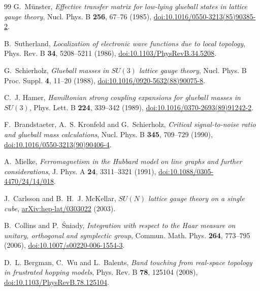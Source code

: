 \documentclass[11pt]{article}
\theoremstyle{plain}
\theoremstyle{definition}
\theoremstyle{remark}
\begin{document}
\begin{thebibliography}{99}
 G.~M\"unster,
  \emph{Effective transfer matrix for low-lying glueball states in lattice
  gauge theory}, Nucl. Phys. B \textbf{256}, 67--76 (1985),
  \href{https://doi.org/10.1016/0550-3213(85)90385-2}{doi:10.1016/0550-3213(85)90385-2}.

 B.~Sutherland,
  \emph{Localization of electronic wave functions due to local topology},
  Phys. Rev. B \textbf{34}, 5208--5211 (1986),
  \href{https://doi.org/10.1103/PhysRevB.34.5208}{doi:10.1103/PhysRevB.34.5208}.

 G.~Schierholz,
  \emph{Glueball masses in $SU(3)$ lattice gauge theory},
  Nucl. Phys. B Proc. Suppl. \textbf{4}, 11--20 (1988),
  \href{https://doi.org/10.1016/0920-5632(88)90075-8}{doi:10.1016/0920-5632(88)90075-8}.

 C.~J. Hamer,
  \emph{Hamiltonian strong coupling expansions for glueball masses in
  $SU(3)$}, Phys. Lett. B \textbf{224}, 339--342 (1989),
  \href{https://doi.org/10.1016/0370-2693(89)91242-2}{doi:10.1016/0370-2693(89)91242-2}.

 F.~Brandstaeter, A.~S. Kronfeld and G.~Schierholz,
  \emph{Critical signal-to-noise ratio and glueball mass calculations},
  Nucl. Phys. B \textbf{345}, 709--729 (1990),
  \href{https://doi.org/10.1016/0550-3213(90)90406-4}{doi:10.1016/0550-3213(90)90406-4}.

 A.~Mielke,
  \emph{Ferromagnetism in the Hubbard model on line graphs and further
  considerations}, J. Phys. A \textbf{24}, 3311--3321 (1991),
  \href{https://doi.org/10.1088/0305-4470/24/14/018}{doi:10.1088/0305-4470/24/14/018}.

 J.~Carlsson and B.~H.~J. McKellar,
  \emph{$SU(N)$ lattice gauge theory on a single cube},
  \href{https://arxiv.org/abs/hep-lat/0303022}{arXiv:hep-lat/0303022} (2003).

 B.~Collins and P.~\'Sniady,
  \emph{Integration with respect to the Haar measure on unitary, orthogonal
  and symplectic group}, Commun. Math. Phys. \textbf{264}, 773--795 (2006),
  \href{https://doi.org/10.1007/s00220-006-1554-3}{doi:10.1007/s00220-006-1554-3}.

 D.~L. Bergman, C.~Wu and L.~Balents,
  \emph{Band touching from real-space topology in frustrated hopping models},
  Phys. Rev. B \textbf{78}, 125104 (2008),
  \href{https://doi.org/10.1103/PhysRevB.78.125104}{doi:10.1103/PhysRevB.78.125104}.


\end{thebibliography}
\end{document}
